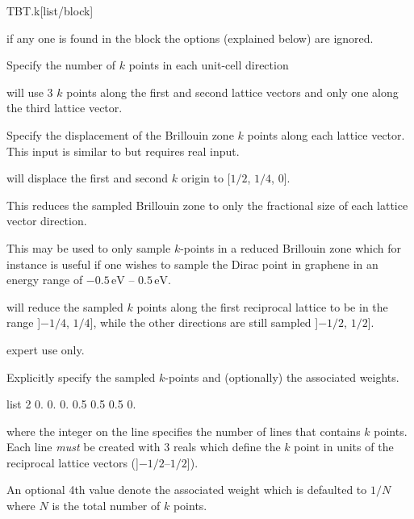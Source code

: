 \begin{fdfentry}{TBT.k}[list/block]
\begin{fdfoptions}
\begin{fdfoptions}
    \end{fdfoptions}

    \note if any one  is found in the block the options
    (explained below) are ignored.



    Specify the number of $k$ points in each unit-cell direction

     will use 3 $k$ points along the first and
    second lattice vectors and only one along the third lattice
    vector.



    Specify the displacement of the Brillouin zone $k$ points along
    each lattice vector. This input is similar to  but
    requires real input.

     will displace the first and
    second $k$ origin to [$1/2$, $1/4$, $0$].


    \option[size]%

    This reduces the sampled Brillouin zone to only the fractional
    size of each lattice vector direction.

    This may be used to only sample $k$-points in a reduced Brillouin
    zone which for instance is useful if one wishes to sample the
    Dirac point in graphene in an energy range of $-0.5\,\mathrm{eV}$
    -- $0.5\,\mathrm{eV}$. 

     will reduce the sampled $k$ points along the
    first reciprocal lattice to be in the range ]$-1/4$, $1/4$], while
    the other directions are still sampled ]$-1/2$, $1/2$].

    \note expert use only.

    \option[list]%

    Explicitly specify the sampled $k$-points and (optionally) the
    associated weights.
    \begin{fdfexample}
  list 2
    0.  0.  0.  0.5
    0.5 0.5 0.
    \end{fdfexample}
    where the integer on the  line specifies the number of
    lines that contains $k$ points. Each line \emph{must} be created
    with $3$ reals which define the $k$ point in units of the
    reciprocal lattice vectors (]$-1/2$--$1/2$]). 

    An optional 4th value denote the associated weight which is
    defaulted to $1/N$ where $N$ is the total number of $k$ points.


\end{fdfoptions}
\end{fdfentry}
